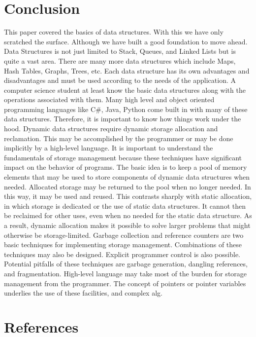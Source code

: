 \documentclass{article}
\begin{document}
\section{Conclusion }
This paper covered the basics of data structures. With 
this we have only scratched the surface.
Although we have built a good foundation to move 
ahead. Data Structures is not just limited to Stack, 
Queues, and Linked Lists but is quite a vast area.
There are many more data structures which include 
Maps, Hash Tables, Graphs, Trees, etc. Each data 
structure has its own advantages and disadvantages 
and must be used according to the needs of the 
application. A computer science student at least know 
the basic data structures along with the operations 
associated with them. Many high level and object 
oriented programming languages like C#, Java, 
Python come built in with many of these data 
structures. Therefore, it is important to know how 
things work under the hood. Dynamic data structures 
require dynamic storage allocation and reclamation. 
This may be accomplished by the programmer or may 
be done implicitly by a high-level language. It is 
important to understand the fundamentals of storage 
management because these techniques have
significant impact on the behavior of programs. The
basic idea is to keep a pool of memory elements that 
may be used to store components of dynamic data 
structures when needed. Allocated storage may be 
returned to the pool when no longer needed. In this 
way, it may be used and reused. This contrasts sharply 
with static allocation, in which storage is dedicated
or the use of static data structures. It cannot then be 
reclaimed for other uses, even when no needed for the 
static data structure. As a result, dynamic allocation 
makes it possible to solve larger problems that might 
otherwise be storage-limited. Garbage collection and 
reference counters are two basic techniques for 
implementing storage management. Combinations of 
these techniques may also be designed. Explicit 
programmer control is also possible. Potential pitfalls
of these techniques are garbage generation, dangling 
references, and fragmentation. High-level language 
may take most of the burden for storage management 
from the programmer. The concept of pointers or 
pointer variables underlies the use of these facilities, 
and complex alg.

\section{References}
\end{document}
